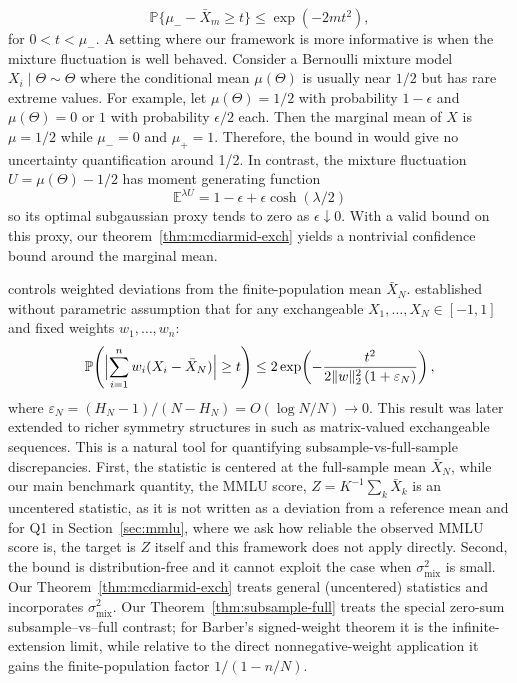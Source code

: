 \documentclass[11pt]{article}
\newcommand{\Pbb}{\mathbb{P}}
\theoremstyle{definition}
\theoremstyle{remark}
\begin{document}
\[
    \Pbb\{\mu_- -\bar X_m\ge t\}\le \exp(-2mt^2),
\]
for $0< t<\mu_-$. A setting where our framework is more informative is when the mixture fluctuation is well behaved. Consider a Bernoulli mixture model $X_i \mid \Theta\sim \Theta$ where the conditional mean $\mu(\Theta)$ is usually near $1/2$ but has rare extreme values. For example, let $\mu(\Theta) = 1/2$ with probability $1-\epsilon$ and $\mu(\Theta) = 0$ or $1$ with probability $\epsilon/2$ each. Then the marginal mean of $X$ is $\mu = 1/2$ while $\mu_- = 0$ and $\mu_+ = 1$. Therefore, the bound in \citet{gottschling2026hoeffding} would give no uncertainty quantification around 1/2. In contrast, the mixture fluctuation $U = \mu(\Theta) - 1/2$ has moment generating function
\[
\mathbb E^{\lambda U} = 1-\epsilon + \epsilon \cosh(\lambda/2)
\]
so its optimal subgaussian proxy tends to zero as $\epsilon\downarrow 0$. With a valid bound on this proxy, our theorem~\ref{thm:mcdiarmid-exch} yields a nontrivial confidence bound around the marginal mean.
 

\citet{foygel2024hoeffding} controls weighted deviations from the finite-population mean $\bar X_N$. \citet{foygel2024hoeffding} established without parametric assumption that for any exchangeable $X_1,\ldots,X_N \in [-1,1]$ and fixed weights
$w_1,\ldots,w_n$:
\begin{equation}\label{eq:barber-review}
  \Pbb\!\left(\Bigl|\sum_{i=1}^n w_i (X_i - \bar{X}_N)\Bigr| \ge t\right)
  \le 2\exp\!\left(-\frac{t^2}{2\|w\|_2^2\,(1+\varepsilon_N)}\right),
\end{equation}
where $\varepsilon_N = (H_N - 1)/(N - H_N) = O(\log N / N) \to 0$. This result was later extended to richer symmetry structures in \citet{cheng2026concentration} such as matrix-valued exchangeable sequences. This is a natural tool for quantifying subsample-vs-full-sample discrepancies. First, the statistic is centered at the full-sample mean $\bar X_N$, while our main benchmark quantity, the MMLU score, $Z = K^{-1}\sum_k \bar X_k$ is an uncentered statistic, as it is not written as a deviation from a reference mean and for Q1 in Section~\ref{sec:mmlu}, where we ask how reliable the observed MMLU score is, the target is $Z$ itself and this framework does not apply directly. Second, the bound is distribution-free and it cannot exploit the case when $\sigma^2_{\mathrm{mix}}$ is small. Our Theorem~\ref{thm:mcdiarmid-exch} treats general (uncentered) statistics and incorporates $\sigma^2_{\mathrm{mix}}$.  Our Theorem~\ref{thm:subsample-full} treats the special zero-sum subsample--vs--full contrast; for Barber's signed-weight theorem it is the infinite-extension limit, while relative to the direct nonnegative-weight application it gains the finite-population factor $1/(1-n/N)$. 
\end{document}
